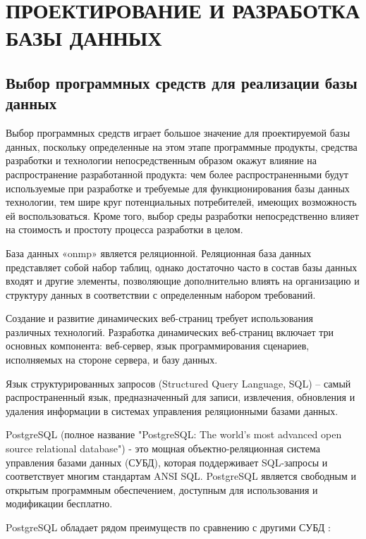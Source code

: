 \section{ПРОЕКТИРОВАНИЕ И РАЗРАБОТКА БАЗЫ ДАННЫХ}

\subsection{Выбор программных средств для реализации базы данных}

Выбор программных средств играет большое значение для проектируемой базы данных, поскольку определенные на этом этапе программные продукты, средства разработки и технологии непосредственным образом окажут влияние на распространение разработанной продукта: чем более распространенными будут используемые при разработке и требуемые для функционирования базы данных технологии, тем шире круг потенциальных потребителей, имеющих возможность ей воспользоваться. Кроме того, выбор среды разработки непосредственно влияет на стоимость и простоту процесса разработки в целом.

База данных «onmp» является реляционной. Реляционная база данных представляет собой набор таблиц, однако достаточно часто в состав базы данных входят и другие элементы, позволяющие дополнительно влиять на организацию и структуру данных в соответствии с определенным набором требований.

Создание и развитие динамических веб-страниц требует использования различных технологий. Разработка динамических веб-страниц включает три основных компонента: веб-сервер, язык программирования сценариев, исполняемых на стороне сервера, и базу данных.

Язык структурированных запросов (Structured Query Language, SQL) – самый распространенный язык, предназначенный для записи, извлечения, обновления и удаления информации в системах управления реляционными базами данных.

PostgreSQL (полное название "PostgreSQL: The world's most advanced open source relational database") - это мощная объектно-реляционная система управления базами данных (СУБД), которая поддерживает SQL-запросы и соответствует многим стандартам ANSI SQL. PostgreSQL является свободным и открытым программным обеспечением, доступным для использования и модификации бесплатно.

PostgreSQL обладает рядом преимуществ по сравнению с другими СУБД \cite{book2, book3} :

